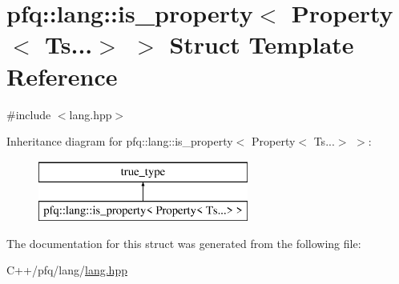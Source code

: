 \hypertarget{structpfq_1_1lang_1_1is__property_3_01Property_3_01Ts_8_8_8_4_01_4}{\section{pfq\+:\+:lang\+:\+:is\+\_\+property$<$ Property$<$ Ts...$>$ $>$ Struct Template Reference}
\label{structpfq_1_1lang_1_1is__property_3_01Property_3_01Ts_8_8_8_4_01_4}
}


{\ttfamily \#include $<$lang.\+hpp$>$}

Inheritance diagram for pfq\+:\+:lang\+:\+:is\+\_\+property$<$ Property$<$ Ts...$>$ $>$\+:\begin{figure}[H]
\begin{center}
\leavevmode
\includegraphics[height=2.000000cm]{structpfq_1_1lang_1_1is__property_3_01Property_3_01Ts_8_8_8_4_01_4}
\end{center}
\end{figure}


The documentation for this struct was generated from the following file\+:\begin{DoxyCompactItemize}
\item 
C++/pfq/lang/\hyperlink{lang_8hpp}{lang.\+hpp}\end{DoxyCompactItemize}
